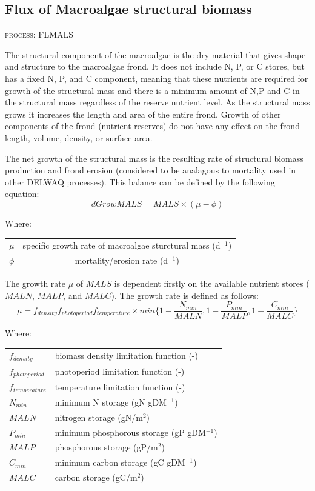\documentclass{deltares_manual}
\begin{document}
\subsection{Flux of Macroalgae structural biomass}
\begin{flushright}
\textsc{process: FLMALS}
\end{flushright}

The structural component of the macroalgae is the dry material that gives shape and structure to the macroalgae frond. It does not include N, P, or C stores, but has a fixed N, P, and C component, meaning that these nutrients are required for growth of the structural mass and there is a minimum amount of N,P and C in the structural mass regardless of the reserve nutrient level. As the structural mass grows it increases the length and area of the entire frond. Growth of other components of the frond (nutrient reserves) do not have any effect on the frond length, volume, density, or surface area. 

The net growth of the structural mass is the resulting rate of structural biomass production and frond erosion (considered to be analagous to mortality used in other DELWAQ processes). This balance can be defined by the following equation:
\begin{equation}
	dGrowMALS =MALS \times (\mu - \phi)
\end{equation}

Where:\\
\begin{tabular}{cc}
	$\mu$  & specific growth rate of macroalgae sturctural mass (d$^{-1}$) \\
	$\phi$ & mortality/erosion rate (d$^{-1}$) \\
\end{tabular}

The growth rate $\mu$ of $MALS$ is dependent firstly on the available nutrient stores ($MALN$, $MALP$, and $MALC$). The growth rate is defined as follows:
\begin{equation}
	\mu = f_{density} f_{photoperiod} f_{temperature}\times min\big\{1-\frac{N_{min}}{MALN},1-\frac{P_{min}}{MALP},1-\frac{C_{min}}{MALC}\big\}
\end{equation}

Where:\\

\begin{tabular}{ll}
$f_{density}$ & biomass density limitation function (-)\\
$f_{photoperiod}$ & photoperiod limitation function (-)\\
$f_{temperature}$ & temperature limitation function (-)\\
$N_{min}$ & minimum N storage (gN gDM$^{-1}$)\\
$MALN$ & nitrogen storage (gN/m$^2$)\\
$P_{min}$ & minimum phosphorous storage (gP gDM$^{-1}$)\\
$MALP$ & phosphorous storage (gP/m$^2$)\\
$C_{min}$ & minimum carbon storage (gC gDM$^{-1}$)\\
$MALC$ & carbon storage (gC/m$^2$)\\
\end{tabular}
\end{document}
